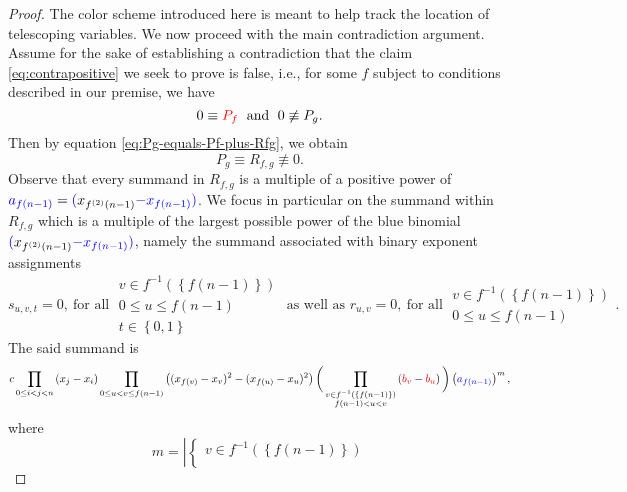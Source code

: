 \begin{proof}
The color scheme introduced here is meant to help track the location
of telescoping variables. We now proceed with the main {contradiction
argument}. Assume for the sake of establishing a contradiction that
the claim \eqref{eq:contrapositive} we seek to prove is false, i.e., for some $f$ subject to conditions
described in our premise, we have
\begin{equation}
0\equiv{\color{red}{\color{red}P_{f}}}\;\text{ and }\;0\not\equiv P_{g}.
\end{equation}
Then by equation \eqref{eq:Pg-equals-Pf-plus-Rfg}, we obtain
\begin{equation}\label{eq:premise}
P_{g}\equiv R_{f,g}\not\equiv0.
\end{equation}
Observe that every summand in $R_{f,g}$ is a multiple of a positive
power of ${\color{blue} a_{f(n-1)}} = {\color{blue}(}x_{f^{\left(2\right)}\left(n-1\right)}{\color{blue}-x_{f\left(n-1\right)})}$.
We focus in particular on the summand within $R_{f,g}$ which is
a multiple of the largest possible power of the blue binomial ${\color{blue}(}x_{f^{\left(2\right)}\left(n-1\right)}{\color{blue}-x_{f\left(n-1\right)})}$,
namely the summand associated with binary exponent assignments
\begin{equation}
s_{u,v,t}=0,\ \text{for all}\;\begin{array}{c}
v\in f^{-1}\left(\left\{ f\left(n-1\right)\right\} \right)\\
0\le u\le f\left(n-1\right)\\
t\in\left\{ 0,1\right\} 
\end{array}\text{ as well as }r_{u,v}=0,\ \text{for all}\;\begin{array}{c}
v\in f^{-1}\left(\left\{ f\left(n-1\right)\right\} \right)\\
0\le u\le f\left(n-1\right)
\end{array}.
\end{equation}
The said summand is
\[
c\,\underset{0\le i<j<n}{\prod}\left(x_{j}-x_{i}\right)\prod_{0\le u<v\le f\left(n-1\right)}\left((x_{f\left(v\right)}-x_{v})^{2}-(x_{f\left(u\right)}-x_{u})^{2}\right)\bigg(\prod_{\substack{v\in f^{-1}\left(\left\{ f\left(n-1\right)\right\} \right)\\
f\left(n-1\right)<u<v
}
}\left({\color{red}b_{v}}-{\color{red}b_{u}}\right)\bigg)\left({\color{blue}a_{f\left(n-1\right)}}\right)^{m},
\]
where
\begin{equation}
m=\left|\left\{ \begin{array}{c}
v\in f^{-1}\left(\left\{ f\left(n-1\right)\right\} \right)\\

\end{array}
\end{equation}
\end{proof}
